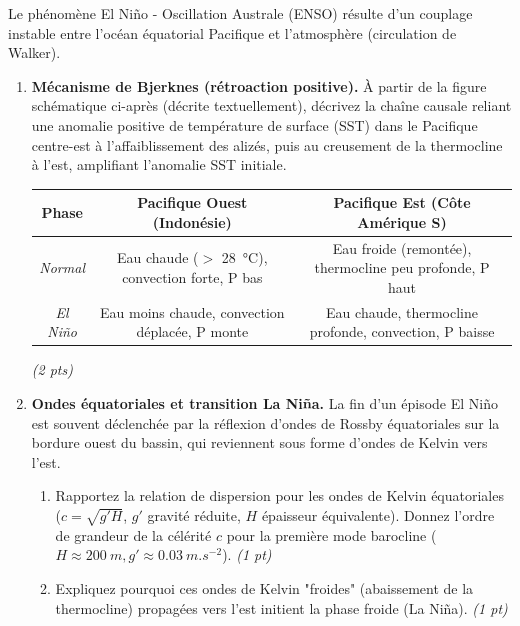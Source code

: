 \documentclass[11pt]{article}
\begin{document}
\begin{exercice}
\label{exo:enso}
Le phénomène El Niño - Oscillation Australe (ENSO) résulte d'un couplage instable entre l'océan équatorial Pacifique et l'atmosphère (circulation de Walker).

\begin{enumerate}
    \item \textbf{Mécanisme de Bjerknes (rétroaction positive).} À partir de la figure schématique ci-après (décrite textuellement), décrivez la chaîne causale reliant une anomalie positive de température de surface (SST) dans le Pacifique centre-est à l'affaiblissement des alizés, puis au creusement de la thermocline à l'est, amplifiant l'anomalie SST initiale.
    \begin{center}
    \begin{tabular}{|c|c|c|}
    \hline
    \textbf{Phase} & \textbf{Pacifique Ouest (Indonésie)} & \textbf{Pacifique Est (Côte Amérique S)} \\
    \hline
    \textit{Normal} & Eau chaude ($>$ \SI{28}{\celsius}), convection forte, P bas & Eau froide (remontée), thermocline peu profonde, P haut \\
    \textit{El Niño} & Eau moins chaude, convection déplacée, P monte & Eau chaude, thermocline profonde, convection, P baisse \\
    \hline
    \end{tabular}
    \end{center}
    \textit{(2 pts)}

    \item \textbf{Ondes équatoriales et transition La Niña.} La fin d'un épisode El Niño est souvent déclenchée par la réflexion d'ondes de Rossby équatoriales sur la bordure ouest du bassin, qui reviennent sous forme d'ondes de Kelvin vers l'est.
    \begin{enumerate}
        \item Rapportez la relation de dispersion pour les ondes de Kelvin équatoriales ($c = \sqrt{g'H}$, $g'$ gravité réduite, $H$ épaisseur équivalente). Donnez l'ordre de grandeur de la célérité $c$ pour la première mode barocline ($H \approx \SI{200}{m}, g' \approx \SI{0.03}{m.s^{-2}}$). \textit{(1 pt)}
        \item Expliquez pourquoi ces ondes de Kelvin "froides" (abaissement de la thermocline) propagées vers l'est initient la phase froide (La Niña). \textit{(1 pt)}
    \end{enumerate}


\end{enumerate}
\end{exercice}
\end{document}

